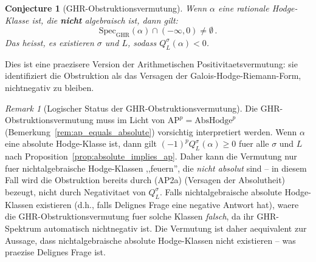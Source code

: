 \documentclass[aps,prd,twocolumn,superscriptaddress,nofootinbib]{revtex4-2}
\newtheorem{conjecture}[theorem]{Conjecture}
\theoremstyle{definition}
\theoremstyle{remark}
\newtheorem{remark}[theorem]{Remark}
\begin{document}
\begin{conjecture}[GHR-Obstruktionsvermutung]
\label{conj:ghr}
Wenn $\alpha$ eine rationale Hodge-Klasse ist, die \textbf{nicht} algebraisch ist, dann gilt:
\begin{equation}
\mathrm{Spec}_{\mathrm{GHR}}(\alpha) \cap (-\infty, 0) \neq \emptyset\,.
\end{equation}
Das heisst, es existieren $\sigma$ und $L$, sodass $Q_L^\sigma(\alpha) < 0$.
\end{conjecture}

Dies ist eine praezisere Version der Arithmetischen Positivitaetsvermutung: sie identifiziert die Obstruktion als das Versagen der Galois-Hodge-Riemann-Form, nichtnegativ zu bleiben.

\begin{remark}[Logischer Status der GHR-Obstruktionsvermutung]
\label{rem:ghr_status}
Die GHR-Obstruktionsvermutung muss im Licht von $\mathrm{AP}^p = \mathrm{AbsHodge}^p$ (Bemerkung~\ref{rem:ap_equals_absolute}) vorsichtig interpretiert werden. Wenn $\alpha$ eine absolute Hodge-Klasse ist, dann gilt $(-1)^p Q_L^\sigma(\alpha) \geq 0$ fuer alle $\sigma$ und $L$ nach Proposition~\ref{prop:absolute_implies_ap}. Daher kann die Vermutung nur fuer nichtalgebraische Hodge-Klassen ,,feuern'', die \textit{nicht absolut} sind -- in diesem Fall wird die Obstruktion bereits durch (AP2a) (Versagen der Absolutheit) bezeugt, nicht durch Negativitaet von $Q_L^\sigma$. Falls nichtalgebraische absolute Hodge-Klassen existieren (d.h., falls Delignes Frage eine negative Antwort hat), waere die GHR-Obstruktionsvermutung fuer solche Klassen \textit{falsch}, da ihr GHR-Spektrum automatisch nichtnegativ ist. Die Vermutung ist daher aequivalent zur Aussage, dass nichtalgebraische absolute Hodge-Klassen nicht existieren -- was praezise Delignes Frage ist.
\end{remark}
\end{document}
